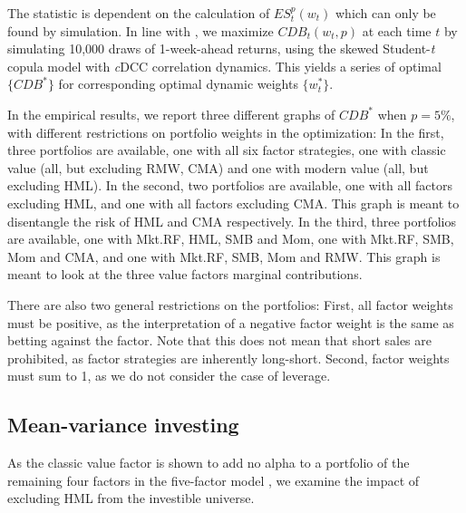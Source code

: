 The statistic is dependent on the calculation of $ES^p_t(w_t)$ which can only be found by simulation. In line with \textcite{ChristoffersenErrunzaJacobLanglois2012}, we maximize $CDB_t(w_t,p)$ at each time $t$ by simulating 10,000 draws of 1-week-ahead returns, using the skewed Student-\textit{t} copula model with \textit{c}DCC correlation dynamics. This yields a series of optimal $\{CDB^*\}$ for corresponding optimal dynamic weights $\{w^*_t\}$.

In the empirical results, we report three different graphs of $CDB^*$ when $p=5\%$, with different restrictions on portfolio weights in the optimization: In the first, three portfolios are available, one with all six factor strategies, one with classic value (all, but excluding RMW, CMA) and one with modern value (all, but excluding HML). In the second, two portfolios are available, one with all factors excluding HML, and one with all factors excluding CMA. This graph is meant to disentangle the risk of HML and CMA respectively. In the third, three portfolios are available, one with Mkt.RF, HML, SMB and Mom, one with Mkt.RF, SMB, Mom and CMA, and one with Mkt.RF, SMB, Mom and RMW. This graph is meant to look at the three value factors marginal contributions.

There are also two general restrictions on the portfolios: First, all factor weights must be positive, as the interpretation of a negative factor weight is the same as betting against the factor. Note that this does not mean that short sales are prohibited, as factor strategies are inherently long-short. Second, factor weights must sum to 1, as we do not consider the case of leverage.

\subsection{Mean-variance investing}
As the classic value factor is shown to add no alpha to a portfolio of the remaining four factors in the five-factor model \autocite{FF2015}, we examine the impact of excluding HML from the investible universe.

